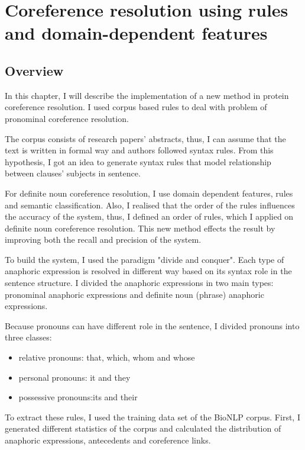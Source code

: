 \chapter{Coreference resolution using rules and domain-dependent features}
\label{chapter:Coreference resolution using rules and domain-dependent features}
\section{Overview}

In this chapter, I will describe the implementation of a new method in protein coreference resolution. I used corpus based rules to deal with problem of pronominal coreference resolution. 

The corpus consists of  research papers' abstracts, thus, I can assume that the text is written in formal way and authors followed syntax rules. From this hypothesis, I got an idea to  generate syntax rules that model relationship between clauses' subjects  in sentence. 

For definite noun coreference resolution, I use domain dependent features, rules and semantic classification. Also, I realised that the order of the rules influences the accuracy of the system, thus, I defined an order of rules, which I applied on definite noun coreference resolution. This new method effects the result by improving both the recall and precision of the system. 

To build the system, I used the paradigm "divide and conquer". Each type of anaphoric expression is resolved in different way based on its syntax role in the sentence structure. I divided the anaphoric expressions in two main types: pronominal anaphoric expressions and definite noun (phrase) anaphoric expressions. 

Because pronouns can have different role in the sentence, I divided  pronouns into three classes:

\begin{itemize}
	\item relative pronouns: that, which, whom and whose 
	\item personal pronouns: it and they 
	\item possessive pronouns:its and their
\end{itemize}

To extract these rules, I used the training data set of the BioNLP corpus. First, I generated different statistics of the corpus and calculated the distribution of anaphoric expressions, antecedents and coreference links. 

